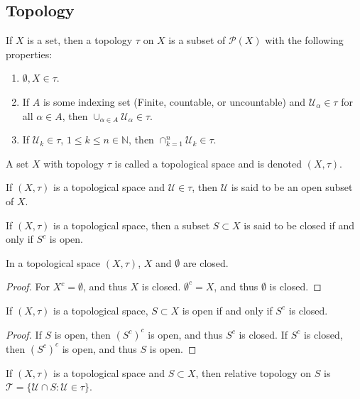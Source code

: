 \documentclass[crop=false,class=book]{standalone}
\begin{document}
\subsection{Topology}
\begin{definition}
If $X$ is a set, then a topology $\tau$ on $X$ is a subset of $\mathcal{P}(X)$ with the following properties:
\begin{enumerate}
\item $\emptyset, X\in \tau$.
\item If $A$ is some indexing set (Finite, countable, or uncountable) and $\mathcal{U}_\alpha \in \tau$ for all $\alpha \in A$, then $\cup_{\alpha \in A} \mathcal{U}_{\alpha} \in \tau$.
\item If $\mathcal{U}_k\in \tau$, $1\leq k \leq n\in \mathbb{N}$, then $\cap_{k=1}^{n}\mathcal{U}_k \in \tau$.
\end{enumerate}
\end{definition}
\begin{definition}
A set $X$ with topology $\tau$ is called a topological space and is denoted $(X,\tau)$.
\end{definition}
\begin{definition}
If $(X,\tau)$ is a topological space and $\mathcal{U}\in \tau$, then $\mathcal{U}$ is said to be an open subset of $X$.
\end{definition}
\begin{definition}
If $(X,\tau)$ is a topological space, then a subset $S\subset X$ is said to be closed if and only if $S^c$ is open.
\end{definition}
\begin{theorem}
In a topological space $(X,\tau)$, $X$ and $\emptyset$ are closed.
\end{theorem}
\begin{proof}
For $X^c = \emptyset$, and thus $X$ is closed. $\emptyset^c=X$, and thus $\emptyset$ is closed.
\end{proof}
\begin{theorem}
If $(X,\tau)$ is a topological space, $S\subset X$ is open if and only if $S^c$ is closed.
\end{theorem}
\begin{proof}
If $S$ is open, then $(S^c)^c$ is open, and thus $S^c$ is closed. If $S^c$ is closed, then $(S^c)^c$ is open, and thus $S$ is open.
\end{proof}
\begin{definition}
If $(X,\tau)$ is a topological space and $S\subset X$, then relative topology on $S$ is $\mathscr{T}=\{\mathcal{U}\cap S:\mathcal{U}\in \tau\}$.
\end{definition}
\end{document}
